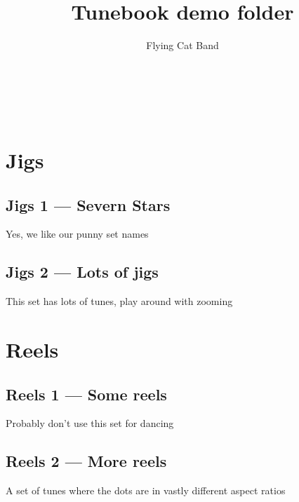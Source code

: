 \documentclass[a4paper,11pt]{article}
\begin{document}
\title{Tunebook demo folder}
\author{Flying Cat Band}

\makeatletter
\begin{titlepage}
    \begin{center}
        {\huge \bfseries  \@title }\\[2ex]
        {\LARGE  \@author}\\[50ex]
    \end{center}
\end{titlepage}
\makeatother
\thispagestyle{empty}
\newpage

\maketitle
\tableofcontents
\clearpage

\setcounter{page}{1} %
\section{Jigs}

\subsection{Jigs 1 --- Severn Stars}
Yes, we like our punny set names
\clearpage

\subsection{Jigs 2 --- Lots of jigs}
This set has lots of tunes, play around with zooming
\clearpage

\section{Reels}
\subsection{Reels 1 --- Some reels}
Probably don't use this set for dancing
\clearpage

\subsection{Reels 2 --- More reels}
A set of tunes where the dots are in vastly different aspect ratios
\end{document}
